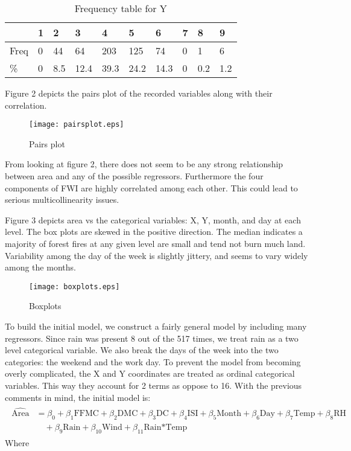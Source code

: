 \documentclass[11pt]{report}
\begin{document}
\begin{table}[!htb]
\begin{center}
    \begin{tabular}{llllllllll}
	&1 &2 &3 &4 &5 &6 &7 & 8 &9\\ \hline 
	Freq&  0 & 44&  64& 203& 125&  74& 0&   1&   6   \\
	\%& 0&8.5& 12.4& 39.3& 24.2& 14.3& 0&  0.2&  1.2   \\
	\hline
    \end{tabular}
		\caption {Frequency table for Y}
\end{center}
\end{table}


Figure 2 depicts the pairs plot of the recorded variables along with their correlation.
\newpage

\begin{figure}[!htb]
\centering
\texttt{[image: pairsplot.eps]}
\caption{Pairs plot}
\end{figure}
\newpage

\noindent From looking at figure 2, there does not seem to be any strong relationship between area and any of the possible regressors. Furthermore the four components of FWI are highly correlated among each other. This could lead to serious multicollinearity issues.

Figure 3 depicts area vs the categorical variables: X, Y, month, and day at each level. The box plots are skewed in the positive direction. The median indicates a majority of forest fires at any given level are small and tend not burn much land. Variability among the day of the week is slightly jittery, and seems to vary widely among the months.


\begin{figure}[!htb]
\centering
\texttt{[image: boxplots.eps]}
\caption{Boxplots}
\end{figure}

\newpage


To build the initial model, we construct a fairly general model by including many regressors. Since rain was present 8 out of the 517 times, we treat rain as a two level categorical variable.  We also break the days of the week into the two categories: the weekend and the work day. To prevent the model from becoming overly complicated, the X and Y coordinates are treated as ordinal categorical variables. This way they account for 2 terms as oppose to 16. With the previous comments in mind, the initial model is:
\begin{align*}
\begin{split}
\widehat{\text{Area}} &= \beta_0 + \beta_1 \text{FFMC} + \beta_2 \text{DMC} + \beta_3 \text{DC} + \beta_4\text{ISI} + \beta_5 \text{Month} + \beta_{6}\text{Day} + \beta_{7}\text{Temp} + \beta_{8}\text{RH}\\
&\quad +\beta_{9}\text{Rain} + \beta_{10}\text{Wind} + \beta_{11}\text{Rain*Temp}
\end{split}
\end{align*}
Where
\end{document}

